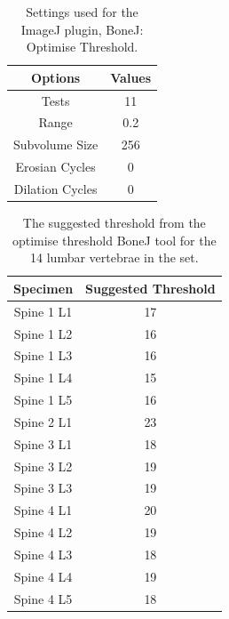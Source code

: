 \begin{table}[ht!]
	\caption{Settings used for the ImageJ plugin, BoneJ: Optimise Threshold.}
	\label{tab:bonej}
	\centering
	\begin{tabular}{c|c}
    Options & Values \\
    \hline
    \hline
    Tests & 11  \\
    Range & 0.2 \\
    Subvolume Size & 256 \\
    Erosian Cycles & 0 \\
    Dilation Cycles & 0 \\
    \hline
	\end{tabular}
\end{table}

\begin{table}[ht!]
	\caption{The suggested threshold from the optimise threshold BoneJ tool for the 14 lumbar vertebrae in the set.}
	\label{tab:optTH}
	\centering
	\begin{tabular}{c|c}
    Specimen    & Suggested Threshold   \\ \hline \hline
    Spine 1 L1 & 17 \\
    Spine 1 L2 & 16\\
    Spine 1 L3 & 16\\
    Spine 1 L4 & 15\\
    Spine 1 L5 & 16\\
    Spine 2 L1 & 23\\
    Spine 3 L1 & 18\\
    Spine 3 L2 & 19\\
    Spine 3 L3 & 19\\
    Spine 4 L1 & 20\\
    Spine 4 L2 & 19\\
    Spine 4 L3 & 18\\
    Spine 4 L4 & 19\\
    Spine 4 L5 & 18\\
    \hline
	\end{tabular}
\end{table}

